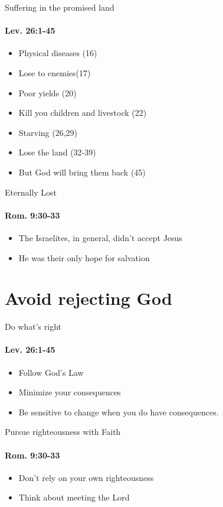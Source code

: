 \begin{frame}{Suffering in the promised land}
\framesubtitle{Lev. 26:1-45}
\begin{itemize}
	\item Physical diseases (16)
	\item Lose to enemies(17)
    \item Poor yields (20)
    \item Kill you children and livestock (22)
    \item Starving (26,29)
    \item Lose the land (32-39)
    \item But God will bring them back (45)
\end{itemize}

\end{frame}

\begin{frame}{Eternally Lost}
\framesubtitle{Rom. 9:30-33}
\begin{itemize}
	\item The Israelites, in general, didn't accept Jesus
	\item He was their only hope for salvation
\end{itemize}

\end{frame}

\section{Avoid rejecting God}

\begin{frame}{Do what's right}
\framesubtitle{Lev. 26:1-45}
\begin{itemize}
	\item Follow God's Law
	\item Minimize your consequences
	\item Be sensitive to change when you do have consequences.
\end{itemize}

\end{frame}

\begin{frame}{Pursue righteousness with Faith}
\framesubtitle{Rom. 9:30-33}
\begin{itemize}
	\item Don't rely on your own righteousness
	\item Think about meeting the Lord
\end{itemize}

\end{frame}

